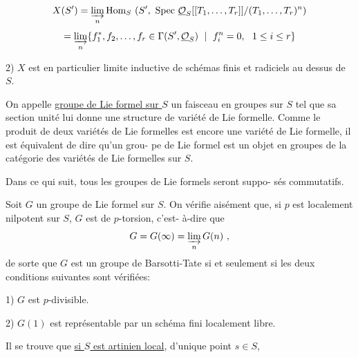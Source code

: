 
\[
X(S') = \varinjlim_{n} \mathrm{Hom}_S\ (S',\ \mathrm{Spec}\ \underline{\mathcal{O}}_S[[T_1,\ldots,T_r]]/(T_1,\ldots,T_r)^n)
\]
\[
= \varinjlim_{n} \{f_1^*,f_2,\ldots,f_r \in \Gamma(S',\underline{\mathcal{O}}_S)\ \mid\ f_i^n = 0,\ \ 1 \leq i \leq r\}
\]

2) $X$ est en particulier limite inductive de schémas finis
et radiciels au dessus de $S$.

On appelle \uline{groupe de Lie formel sur $S$} un faisceau en groupes
sur $S$ tel que sa section unité lui donne une structure de variété de
Lie formelle. Comme le produit de deux variétés de Lie formelles est
encore une variété de Lie formelle, il est équivalent de dire qu'un grou-%
pe de Lie formel est un objet en groupes de la catégorie des variétés de
Lie formelles sur $S$.

Dans ce qui suit, tous les groupes de Lie formels seront suppo-%
sés commutatifs.

Soit $G$ un groupe de Lie formel sur $S$. On vérifie aisément
que, si $p$ est localement nilpotent sur $S$, $G$ est de $p$-torsion, c'est-%
à-dire que
\[
G = G(\infty) = \varinjlim_{n} G(n) \ ,
\]
de sorte que $G$ est un groupe de Barsotti-Tate si et seulement si les
deux conditions suivantes sont vérifiées:

1) $G$ est $p$-divisible.

2) $G(1)$ est représentable par un schéma fini localement libre.

Il se trouve que \uline{si $S$ est artinien local}, d'unique point $s \in S$,

